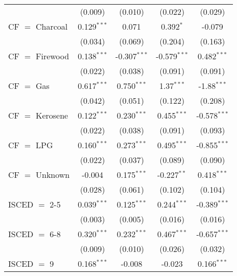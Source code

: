 \begin{table}[htbp!]
\begin{adjustbox}{width = 1\textwidth, max height = 0.95\textheight, center}
\begin{threeparttable}[b]
\begin{tabular}{lcccc}
                                 & (0.009)            & (0.010)            & (0.022)        & (0.029)\\   
            CF $=$ Charcoal      & 0.129$^{***}$      & 0.071              & 0.392$^{*}$    & -0.079\\   
                                 & (0.034)            & (0.069)            & (0.204)        & (0.163)\\   
            CF $=$ Firewood      & 0.138$^{***}$      & -0.307$^{***}$     & -0.579$^{***}$ & 0.482$^{***}$\\   
                                 & (0.022)            & (0.038)            & (0.091)        & (0.091)\\   
            CF $=$ Gas           & 0.617$^{***}$      & 0.750$^{***}$      & 1.37$^{***}$   & -1.88$^{***}$\\   
                                 & (0.042)            & (0.051)            & (0.122)        & (0.208)\\   
            CF $=$ Kerosene      & 0.122$^{***}$      & 0.230$^{***}$      & 0.455$^{***}$  & -0.578$^{***}$\\   
                                 & (0.022)            & (0.038)            & (0.091)        & (0.093)\\   
            CF $=$ LPG           & 0.160$^{***}$      & 0.273$^{***}$      & 0.495$^{***}$  & -0.855$^{***}$\\   
                                 & (0.022)            & (0.037)            & (0.089)        & (0.090)\\   
            CF $=$ Unknown       & -0.004             & 0.175$^{***}$      & -0.227$^{**}$  & 0.418$^{***}$\\   
                                 & (0.028)            & (0.061)            & (0.102)        & (0.104)\\   
            ISCED $=$ 2-5        & 0.039$^{***}$      & 0.125$^{***}$      & 0.244$^{***}$  & -0.389$^{***}$\\   
                                 & (0.003)            & (0.005)            & (0.016)        & (0.016)\\   
            ISCED $=$ 6-8        & 0.320$^{***}$      & 0.232$^{***}$      & 0.467$^{***}$  & -0.657$^{***}$\\   
                                 & (0.009)            & (0.010)            & (0.026)        & (0.032)\\   
            ISCED $=$ 9          & 0.168$^{***}$      & -0.008             & -0.023         & 0.166$^{***}$\\   

\end{tabular}
\end{threeparttable}
\end{adjustbox}
\end{table}
